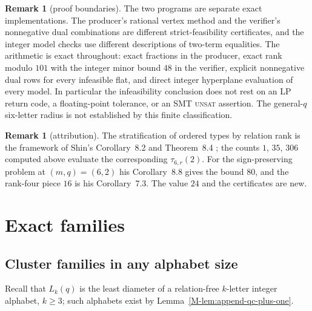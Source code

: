 \documentclass[11pt,reqno]{amsart}
\theoremstyle{plain}
\theoremstyle{definition}
\newtheorem{remark}[theorem]{Remark}
\theoremstyle{plain}
\theoremstyle{plain}
\theoremstyle{plain}
\theoremstyle{plain}
\theoremstyle{plain}
\theoremstyle{plain}
\theoremstyle{definition}
\theoremstyle{definition}
\theoremstyle{definition}
\theoremstyle{plain}
\begin{document}
\begin{remark}[proof boundaries]\label{M-rem:six-boundaries}
The two programs are separate exact implementations. The producer's rational
vertex method and the verifier's nonnegative dual combinations are different
strict-feasibility certificates, and the integer model checks use different
descriptions of two-term equalities. The arithmetic is exact throughout:
exact fractions in the producer, exact rank modulo $101$ with the integer
minor bound $48$ in the verifier, explicit nonnegative dual rows for every
infeasible flat, and direct integer hyperplane evaluation of every model. In
particular the infeasibility conclusion does not rest on an LP return code,
a floating-point tolerance, or an SMT \textsc{unsat} assertion. The
general-$q$ six-letter radius is not established by this finite
classification.
\end{remark}

\begin{remark}[attribution]\label{M-rem:six-attribution}
The stratification of ordered types by relation rank is the framework of
Shin's Corollary~8.2 and Theorem~8.4 \cite{M-Shin26}; the counts $1$, $35$,
$306$ computed above evaluate the corresponding $\tau_{6,r}(2)$. For
the sign-preserving problem at $(m,q)=(6,2)$ his Corollary~8.8 gives the
bound $80$, and the rank-four piece $16$ is his Corollary~7.3. The value
$24$ and the certificates are new.
\end{remark}

\section{Exact families}\label{M-sec:cluster}

\subsection{Cluster families in any alphabet size}
Recall that $L_k(q)$ is the least diameter of a relation-free $k$-letter
integer alphabet, $k\ge3$; such alphabets exist by
Lemma~\ref{M-lem:append-qc-plus-one}.
\end{document}
